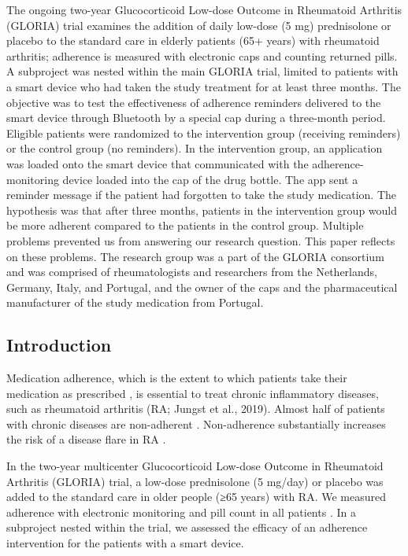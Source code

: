 \documentclass{article}
\begin{document}
The ongoing two-year Glucocorticoid Low-dose Outcome in Rheumatoid Arthritis (GLORIA) trial examines the addition of daily low-dose (5 mg) prednisolone or placebo to the standard care in elderly patients (65+ years) with rheumatoid arthritis; adherence is measured with electronic caps and counting returned pills. A subproject was nested within the main GLORIA trial, limited to patients with a smart device who had taken the study treatment for at least three months. The objective was to test the effectiveness of adherence reminders delivered to the smart device through Bluetooth by a special cap during a three-month period. Eligible patients were randomized to the intervention group (receiving reminders) or the control group (no reminders). In the intervention group, an application was loaded onto the smart device that communicated with the adherence-monitoring device loaded into the cap of the drug bottle. The app sent a reminder message if the patient had forgotten to take the study medication. The hypothesis was that after three months, patients in the intervention group would be more adherent compared to the patients in the control group. Multiple problems prevented us from answering our research question. This paper reflects on these problems. The research group was a part of the GLORIA consortium and was comprised of rheumatologists and researchers from the Netherlands, Germany, Italy, and Portugal, and the owner of the caps and the pharmaceutical manufacturer of the study medication from Portugal.



\subsection{Introduction}

Medication adherence, which is the extent to which patients take their medication as prescribed \parencite{Brown2011}, is essential to treat chronic inflammatory diseases, such as rheumatoid arthritis (RA; Jungst et al., 2019). Almost half of patients with chronic diseases are non-adherent \parencite{Jungst2019, Kini2018}. Non-adherence substantially increases the risk of a disease flare in RA \parencite{Jungst2019}. 



In the two-year multicenter Glucocorticoid Low-dose Outcome in Rheumatoid Arthritis (GLORIA) trial, a low-dose prednisolone (5 mg/day) or placebo was added to the standard care in older people (≥65 years) with RA. We measured adherence with electronic monitoring and pill count in all patients \parencite{Hartman2021}. In a subproject nested within the trial, we assessed the efficacy of an adherence intervention for the patients with a smart device. 
\end{document}

